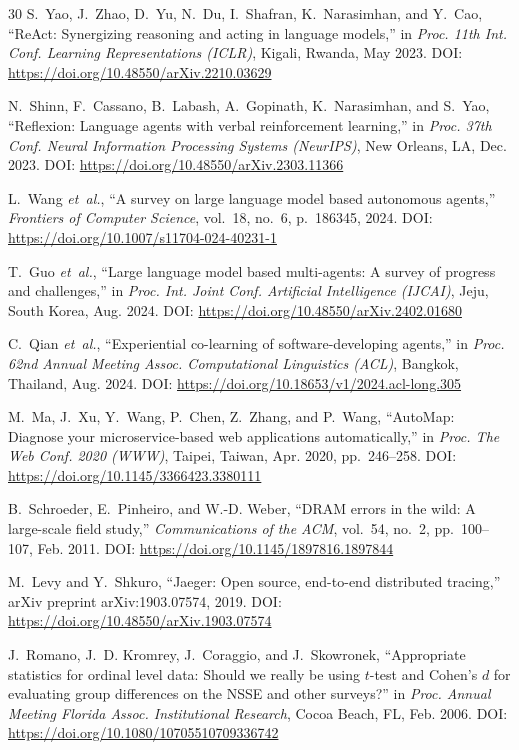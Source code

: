 \documentclass[journal,10pt,twoside]{IEEEtran}
\begin{document}
\begin{thebibliography}{30}
S.~Yao, J.~Zhao, D.~Yu, N.~Du, I.~Shafran, K.~Narasimhan, and Y.~Cao,
``ReAct: Synergizing reasoning and acting in language models,''
in \textit{Proc. 11th Int. Conf. Learning Representations (ICLR)},
Kigali, Rwanda, May 2023.
\newblock DOI: \url{https://doi.org/10.48550/arXiv.2210.03629}

N.~Shinn, F.~Cassano, B.~Labash, A.~Gopinath, K.~Narasimhan, and S.~Yao,
``Reflexion: Language agents with verbal reinforcement learning,''
in \textit{Proc. 37th Conf. Neural Information Processing Systems
(NeurIPS)}, New Orleans, LA, Dec. 2023.
\newblock DOI: \url{https://doi.org/10.48550/arXiv.2303.11366}

L.~Wang \textit{et~al.},
``A survey on large language model based autonomous agents,''
\textit{Frontiers of Computer Science}, vol.~18, no.~6, p.~186345, 2024.
\newblock DOI: \url{https://doi.org/10.1007/s11704-024-40231-1}

T.~Guo \textit{et~al.},
``Large language model based multi-agents: A survey of progress and challenges,''
in \textit{Proc. Int. Joint Conf. Artificial Intelligence (IJCAI)},
Jeju, South Korea, Aug. 2024.
\newblock DOI: \url{https://doi.org/10.48550/arXiv.2402.01680}

C.~Qian \textit{et~al.},
``Experiential co-learning of software-developing agents,''
in \textit{Proc. 62nd Annual Meeting Assoc. Computational Linguistics
(ACL)}, Bangkok, Thailand, Aug. 2024.
\newblock DOI: \url{https://doi.org/10.18653/v1/2024.acl-long.305}

M.~Ma, J.~Xu, Y.~Wang, P.~Chen, Z.~Zhang, and P.~Wang,
``AutoMap: Diagnose your microservice-based web applications automatically,''
in \textit{Proc. The Web Conf. 2020 (WWW)},
Taipei, Taiwan, Apr. 2020, pp.~246--258.
\newblock DOI: \url{https://doi.org/10.1145/3366423.3380111}

B.~Schroeder, E.~Pinheiro, and W.-D. Weber,
``DRAM errors in the wild: A large-scale field study,''
\textit{Communications of the ACM}, vol.~54, no.~2, pp.~100--107,
Feb. 2011.
\newblock DOI: \url{https://doi.org/10.1145/1897816.1897844}

M.~Levy and Y.~Shkuro,
``Jaeger: Open source, end-to-end distributed tracing,''
arXiv preprint arXiv:1903.07574, 2019.
\newblock DOI: \url{https://doi.org/10.48550/arXiv.1903.07574}

J.~Romano, J.~D. Kromrey, J.~Coraggio, and J.~Skowronek,
``Appropriate statistics for ordinal level data: Should we really be using
$t$-test and Cohen's $d$ for evaluating group differences on the NSSE
and other surveys?''
in \textit{Proc. Annual Meeting Florida Assoc. Institutional Research},
Cocoa Beach, FL, Feb. 2006.
\newblock DOI: \url{https://doi.org/10.1080/10705510709336742}


\end{thebibliography}
\end{document}
